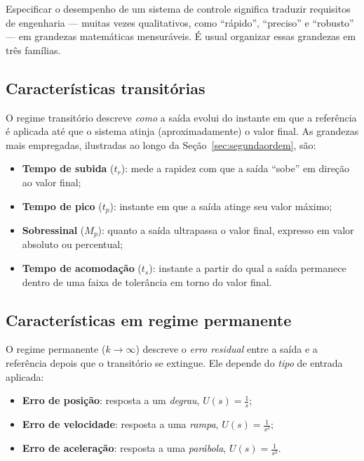 \documentclass[11pt,a4paper,oneside]{book}
\theoremstyle{definition}
\theoremstyle{plain}
\begin{document}
Especificar o desempenho de um sistema de controle significa traduzir
requisitos de engenharia --- muitas vezes qualitativos, como ``rápido'',
``preciso'' e ``robusto'' --- em grandezas matemáticas mensuráveis. É usual
organizar essas grandezas em três famílias.

\subsection{Características transitórias}

O regime transitório descreve \emph{como} a saída evolui do instante em que a
referência é aplicada até que o sistema atinja (aproximadamente) o valor final.
As grandezas mais empregadas, ilustradas ao longo da
Seção~\ref{sec:segundaordem}, são:

\begin{itemize}
    \item \textbf{Tempo de subida} ($t_r$): mede a rapidez com que a saída
    ``sobe'' em direção ao valor final;
    \item \textbf{Tempo de pico} ($t_p$): instante em que a saída atinge seu
    valor máximo;
    \item \textbf{Sobressinal} ($M_p$): quanto a saída ultrapassa o valor
    final, expresso em valor absoluto ou percentual;
    \item \textbf{Tempo de acomodação} ($t_s$): instante a partir do qual a
    saída permanece dentro de uma faixa de tolerância em torno do valor final.
\end{itemize}

\subsection{Características em regime permanente}

O regime permanente ($k\to\infty$) descreve o \emph{erro residual} entre a saída
e a referência depois que o transitório se extingue. Ele depende do
\emph{tipo} de entrada aplicada:

\begin{itemize}
    \item \textbf{Erro de posição}: resposta a um \emph{degrau}, $U(s)=\tfrac1s$;
    \item \textbf{Erro de velocidade}: resposta a uma \emph{rampa}, $U(s)=\tfrac1{s^2}$;
    \item \textbf{Erro de aceleração}: resposta a uma \emph{parábola}, $U(s)=\tfrac1{s^3}$.
\end{itemize}
\end{document}
